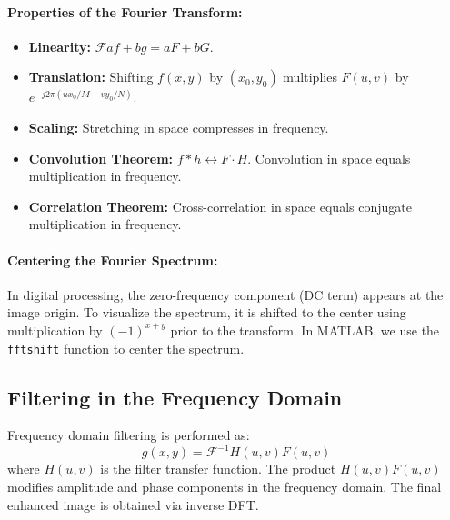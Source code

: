 \documentclass[12pt,a4paper]{AnantDocumentation}
\begin{document}
\paragraph{Properties of the Fourier Transform:}
\begin{itemize}
\item \textbf{Linearity:} $\mathcal{F}{a f + b g} = aF + bG$.
\item \textbf{Translation:} Shifting $f(x,y)$ by $(x_0,y_0)$ multiplies $F(u,v)$ by $e^{-j2\pi(ux_0/M + vy_0/N)}$.
\item \textbf{Scaling:} Stretching in space compresses in frequency.
\item \textbf{Convolution Theorem:} $f*h \leftrightarrow F \cdot H$. Convolution in space equals multiplication in frequency.
\item \textbf{Correlation Theorem:} Cross-correlation in space equals conjugate multiplication in frequency.
\end{itemize}

\paragraph{Centering the Fourier Spectrum:}
In digital processing, the zero-frequency component (DC term) appears at the image origin. To visualize the spectrum, it is shifted to the center using multiplication by $(-1)^{x+y}$ prior to the transform.
In MATLAB, we use the \lstinline[language=python]{fftshift} function to center the spectrum.
\subsection{Filtering in the Frequency Domain}
Frequency domain filtering is performed as:
\begin{equation}
g(x, y) = \mathcal{F}^{-1}{ H(u, v)F(u, v) }
\end{equation}
where $H(u,v)$ is the filter transfer function. The product $H(u,v)F(u,v)$ modifies amplitude and phase components in the frequency domain. The final enhanced image is obtained via inverse DFT.
\end{document}
